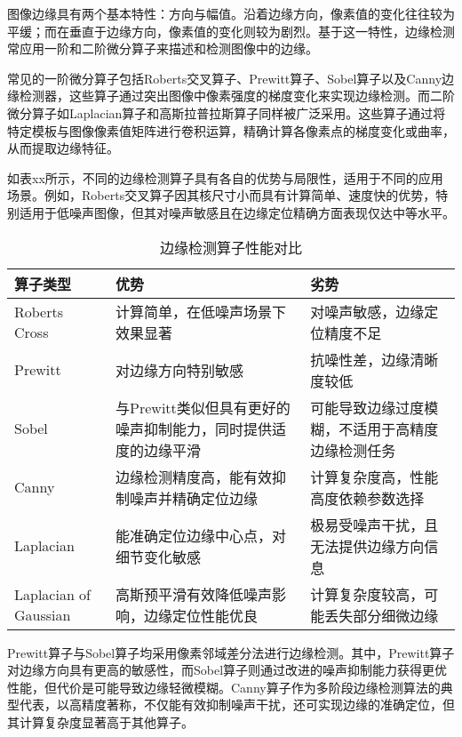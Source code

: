 图像边缘具有两个基本特性：方向与幅值。沿着边缘方向，像素值的变化往往较为平缓；而在垂直于边缘方向，像素值的变化则较为剧烈。基于这一特性，边缘检测常应用一阶和二阶微分算子来描述和检测图像中的边缘。

常见的一阶微分算子包括Roberts交叉算子、Prewitt算子、Sobel算子以及Canny边缘检测器，这些算子通过突出图像中像素强度的梯度变化来实现边缘检测。而二阶微分算子如Laplacian算子和高斯拉普拉斯算子同样被广泛采用。这些算子通过将特定模板与图像像素值矩阵进行卷积运算，精确计算各像素点的梯度变化或曲率，从而提取边缘特征。

如表xx所示，不同的边缘检测算子具有各自的优势与局限性，适用于不同的应用场景。例如，Roberts交叉算子因其核尺寸小而具有计算简单、速度快的优势，特别适用于低噪声图像，但其对噪声敏感且在边缘定位精确方面表现仅达中等水平。

\begin{table}[htbp]
    \centering
    \caption{边缘检测算子性能对比}
    \label{tab:edge_operators}
    \begin{tabular}{>{\raggedright}p{3cm}>{\raggedright}p{4.5cm}>{\raggedright}p{4.5cm}}
        \toprule
        \textbf{算子类型} & \textbf{优势} & \textbf{劣势} \\
        \midrule
        Roberts Cross & 计算简单，在低噪声场景下效果显著 & 对噪声敏感，边缘定位精度不足 \\
        \addlinespace[0.2cm]
        Prewitt & 对边缘方向特别敏感 & 抗噪性差，边缘清晰度较低 \\
        \addlinespace[0.2cm]
        Sobel & 与Prewitt类似但具有更好的噪声抑制能力，同时提供适度的边缘平滑 & 可能导致边缘过度模糊，不适用于高精度边缘检测任务 \\
        \addlinespace[0.2cm]
        Canny & 边缘检测精度高，能有效抑制噪声并精确定位边缘 & 计算复杂度高，性能高度依赖参数选择 \\
        \addlinespace[0.2cm]
        Laplacian & 能准确定位边缘中心点，对细节变化敏感 & 极易受噪声干扰，且无法提供边缘方向信息 \\
        \addlinespace[0.2cm]
        Laplacian of Gaussian & 高斯预平滑有效降低噪声影响，边缘定位性能优良 & 计算复杂度较高，可能丢失部分细微边缘 \\
        \bottomrule
    \end{tabular}
\end{table}


Prewitt算子与Sobel算子均采用像素邻域差分法进行边缘检测。其中，Prewitt算子对边缘方向具有更高的敏感性，而Sobel算子则通过改进的噪声抑制能力获得更优性能，但代价是可能导致边缘轻微模糊。Canny算子作为多阶段边缘检测算法的典型代表，以高精度著称，不仅能有效抑制噪声干扰，还可实现边缘的准确定位，但其计算复杂度显著高于其他算子。

